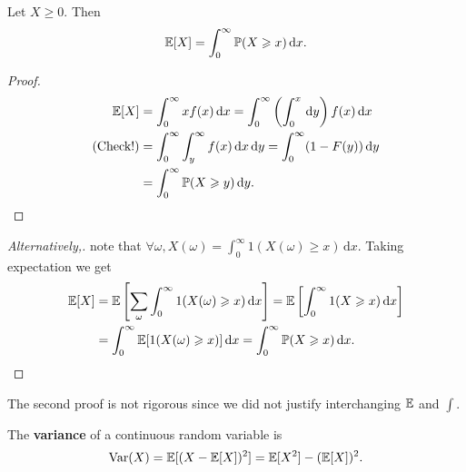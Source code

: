 \begin{proposition}
    Let $X\ge 0$. Then 
    \[
        {\mathbb{E}}[X] = \int_{0}^{\infty} \mathbb{P}(X\geqslant x) \,\mathrm{d}x.
    \]
\end{proposition}
\begin{proof}
    \begin{align*}
        {\mathbb{E}}[X]&= \int_{0}^{\infty} xf(x) \,\mathrm{d}x=\int_{0}^{\infty} \left( \int_{0}^{x}  \,\mathrm{d}y \right)f(x) \,\mathrm{d}x\\ 
        \text{(Check!)}&= \int_{0}^{\infty} \int_{y}^{\infty} f(x) \,\mathrm{d}x \,\mathrm{d}y = \int_{0}^{\infty} (1-F(y)) \,\mathrm{d}y\\ 
        &= \int_{0}^{\infty} \mathbb{P}(X\geqslant y) \,\mathrm{d}y.\qedhere
    \end{align*}
\end{proof}
\begin{proof}[Alternatively,]
    note that $ \forall \omega, X(\omega)=\int_{0}^{\infty} 1(X(\omega)\ge x) \,\mathrm{d}x $. Taking expectation we get 
    \begin{align*}
        {\mathbb{E}}[X] &= {\mathbb{E}}\left[ \sum_{\omega}\int_{0}^{\infty} 1(X(\omega)\geqslant x) \,\mathrm{d}x \right] = {\mathbb{E}}\left[ \int_{0}^{\infty} 1(X\geqslant x) \,\mathrm{d}x \right]\\
        &= \int_{0}^{\infty} {\mathbb{E}}[1(X(\omega)\geqslant x)] \,\mathrm{d}x = \int_{0}^{\infty} \mathbb{P}(X\geqslant x) \,\mathrm{d}x.\qedhere
    \end{align*}
\end{proof}
\begin{remark}
    The second proof is not rigorous since we did not justify interchanging $ {\mathbb{E}} $ and $ \int $.
\end{remark}

\begin{definition}[Variance]
    The \textbf{variance} of a continuous random variable is
    \[
        \operatorname{Var}(X) = {\mathbb{E}}[(X-{\mathbb{E}}[X])^2] = {\mathbb{E}}[X^2]-({\mathbb{E}}[X])^2.
    \]
\end{definition}

